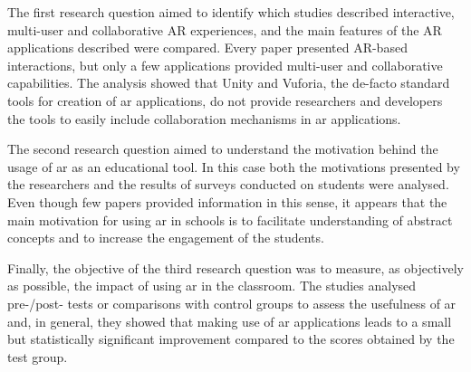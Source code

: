 The first research question aimed to identify which studies described interactive, multi-user and collaborative AR experiences, and the main features of the AR applications described were compared. Every paper presented AR-based interactions, but only a few applications provided multi-user and collaborative capabilities. The analysis showed that Unity and Vuforia, the de-facto standard tools for creation of \gls{ar} applications, do not provide researchers and developers the tools to easily include collaboration mechanisms in \gls{ar} applications.

The second research question aimed to understand the motivation behind the usage of \gls{ar} as an educational tool. In this case both the motivations presented by the researchers and the results of surveys conducted on students were analysed. Even though few papers provided information in this sense, it appears that the main motivation for using \gls{ar} in schools is to facilitate understanding of abstract concepts and to increase the engagement of the students.

Finally, the objective of the third research question was to measure, as objectively as possible, the impact of using \gls{ar} in the classroom. The studies analysed pre-/post- tests or comparisons with control groups to assess the usefulness of \gls{ar} and, in general, they showed that making use of \gls{ar} applications leads to a small but statistically significant improvement compared to the scores obtained by the test group.   